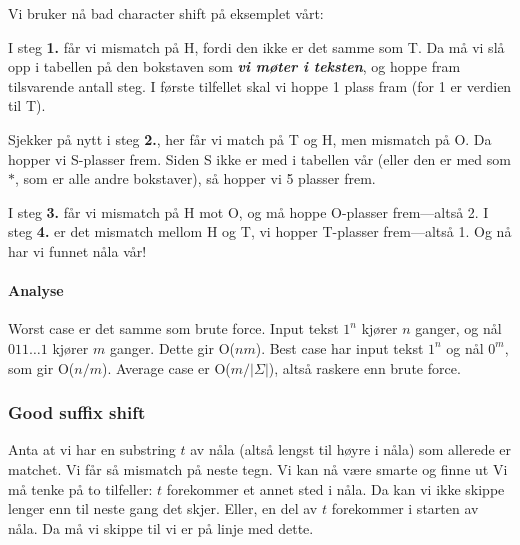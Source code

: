 Vi bruker nå bad character shift på eksemplet vårt: \newline
{}

I steg \textbf{1.} får vi mismatch på H, fordi den ikke er det samme som T. Da må vi slå opp i tabellen på den bokstaven som \textbf{\textit{vi møter i teksten}}, og hoppe fram tilsvarende antall steg. I første tilfellet skal vi hoppe 1 plass fram (for 1 er verdien til T). 

Sjekker på nytt i steg \textbf{2.}, her får vi match på T og H, men mismatch på O. Da hopper vi S-plasser frem. Siden S ikke er med i tabellen vår (eller den er med som $*$, som er alle andre bokstaver), så hopper vi 5 plasser frem.

I steg \textbf{3.} får vi mismatch på H mot O, og må hoppe O-plasser frem---altså 2. I steg \textbf{4.} er det mismatch mellom H og T, vi hopper T-plasser frem---altså 1. Og nå har vi funnet nåla vår!

\paragraph{Analyse}
Worst case er det samme som brute force. Input tekst $1^n$ kjører $n$ ganger, og nål $011\dots1$ kjører $m$ ganger. Dette gir O($nm$). Best case har input tekst $1^n$ og nål $0^m$, som gir O($n/m$). Average case er O($m/|\Sigma|$), altså raskere enn brute force.
	
	\subsubsection{\color{red}Good suffix shift}
		Anta at vi har en substring $t$ av nåla (altså lengst til høyre i nåla) som allerede er matchet. Vi får så mismatch på neste tegn. Vi kan nå være smarte og finne ut
		Vi må tenke på to tilfeller: $t$ forekommer et annet sted i nåla. Da kan vi ikke skippe lenger enn til neste gang det skjer. Eller, en del av $t$ forekommer i starten av nåla. Da må vi skippe til vi er på linje med dette.
	
